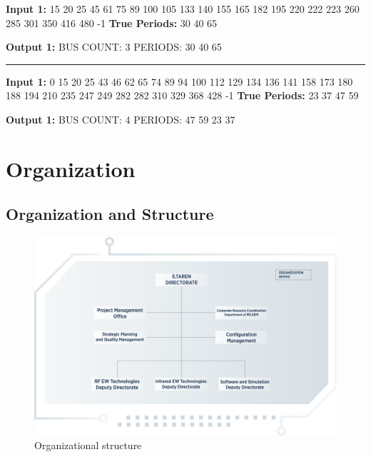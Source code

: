 \documentclass[12pt]{report}
\begin{document}
        \textbf{Input 1:} 15 20 25 45 61 75 89 100 105 133 140 155 165 182 195 220 222 223 260 285 301 350 416 480 -1 \newline
        \textbf{True Periods: } 30 40 65 \newline

        \textbf{Output 1:}\newline
        BUS COUNT: 3 \newline
        PERIODS: 30 40 65 \newline
        
        \bigskip \hrule \bigskip \bigskip

        \textbf{Input 1:} 0 15 20 25 43 46 62 65 74 89 94 100 112 129 134 136 141 158 173 180 188 194 210 235 247 249 282 282 310 329 368 428 -1 \newline
        \textbf{True Periods: } 23 37 47 59 \newline

        \textbf{Output 1:}\newline
        BUS COUNT: 4 \newline
        PERIODS: 47 59 23 37


\chapter{Organization}

    \section{Organization and Structure}

    \begin{figure}[h]
        \includegraphics[scale=0.18]{iltaren-organization}
        \centering
        \caption{Organizational structure}
    \end{figure}
\end{document}
